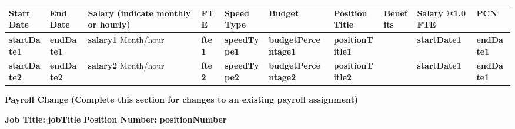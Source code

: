 \documentclass{article}
\newenvironment{temp}
{}
{}
\begin{document}
\begin{Form}
\renewcommand{\arraystretch}{2}
\begin{center}
\begin{tabular}{ |m{1.6cm}|m{1.5cm}|m{2cm}|m{0.9cm}|m{2.5cm}|m{1cm}|m{2.2cm}|m{1.9cm}|m{0.7cm}|m{2cm}| } 
 \hline
 Start Date & End Date & Salary (indicate monthly or hourly) & FTE & Speed Type & Budget & Position Title & Benefits & Salary @1.0 FTE & PCN\\ 
 \hline
 \textbf{ {{startDate1}} } & \textbf{ {{endDate1}} } & \textbf{ {{salary1}} } \scriptsize Month/hour & \textbf{ {{fte1}} } & \textbf{ {{speedType1}} } & \textbf{ {{budgetPercentage1}} } & \textbf{ {{positionTitle1}} } & {}
 \parbox{2cm}{
 }
 & \textbf{ {{startDate1}} } & \textbf{ {{endDate1}} } \\ 
 \hline
 \textbf{ {{startDate2}} } & \textbf{ {{endDate2}} } & \textbf{ {{salary2}} } \scriptsize Month/hour & \textbf{ {{fte2}} } & \textbf{ {{speedType2}} } & \textbf{ {{budgetPercentage2}} } & \textbf{ {{positionTitle2}} } & {}
 \parbox{2cm}{
 }
 & \textbf{ {{startDate1}} } & \textbf{ {{endDate1}} } \\ 
 \hline
\end{tabular}
\end{center}
\end{Form}

\begin{tcolorbox}[standard jigsaw, opacityback=0]
    \begin{temp}
        \LARGE\textbf{Payroll Change} \normalsize\color{blue}\textbf{(Complete this section for changes to an existing payroll assignment)}
    \end{temp}
    
    \begin{Form}
        \vspace{0.1cm}
        \textbf{Job Title:} \textbf{ {{jobTitle}} } 
        \hspace{0.3cm} \textbf{Position Number:} \textbf{ {{positionNumber}} }
    \end{Form}
\end{tcolorbox}
\end{document}
